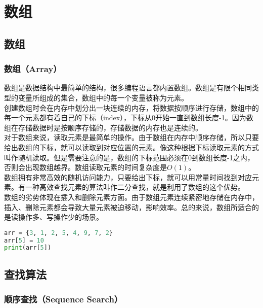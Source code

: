 \chapter{数组}

\section{数组}

\subsection{数组（Array）}

数组是数据结构中最简单的结构，很多编程语言都内置数组。数组是有限个相同类型的变量所组成的集合，数组中的每一个变量被称为元素。 \\

创建数组时会在内存中划分出一块连续的内存，将数据按顺序进行存储，数组中的每一个元素都有着自己的下标（index），下标从0开始一直到数组长度-1。因为数组在存储数据时是按顺序存储的，存储数据的内存也是连续的。 \\

对于数组来说，读取元素是最简单的操作。由于数组在内存中顺序存储，所以只要给出数组的下标，就可以读取到对应位置的元素。像这种根据下标读取元素的方式叫作随机读取。但是需要注意的是，数组的下标范围必须在0到数组长度-1之内，否则会出现数组越界。数组读取元素的时间复杂度是$ O(1) $。 \\

数组拥有非常高效的随机访问能力，只要给出下标，就可以用常量时间找到对应元素。有一种高效查找元素的算法叫作二分查找，就是利用了数组的这个优势。 \\

数组的劣势体现在插入和删除元素方面。由于数组元素连续紧密地存储在内存中，插入、删除元素都会导致大量元素被迫移动，影响效率。总的来说，数组所适合的是读操作多、写操作少的场景。 \\


\begin{lstlisting}[language=Python]
arr = {3, 1, 2, 5, 4, 9, 7, 2}
arr[5] = 10
print(arr[5])
\end{lstlisting}

\newpage

\section{查找算法}

\subsection{顺序查找（Sequence Search）}

